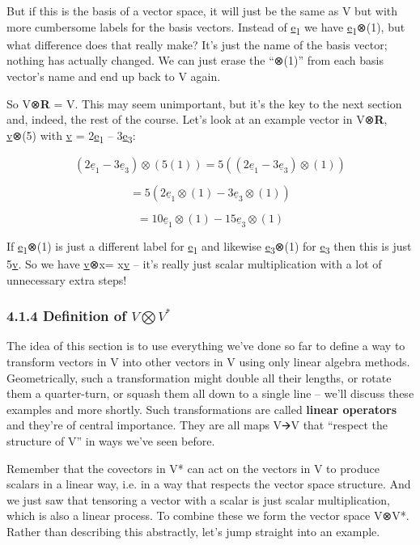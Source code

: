 \documentclass[oneside,english]{amsbook}
\numberwithin{section}{chapter}
\theoremstyle{plain}
\theoremstyle{definition}
\begin{document}
But if this is the basis of a vector space, it will just be the same as
V but with more cumbersome labels for the basis vectors. Instead of
\ul{e}\textsubscript{1} we have \ul{e}\textsubscript{1}⊗(1), but what
difference does that really make? It's just the name of the basis
vector; nothing has actually changed. We can just erase the ``⊗(1)''
from each basis vector's name and end up back to V again.

So V⊗\textbf{R} = V. This may seem unimportant, but it's the key to the
next section and, indeed, the rest of the course. Let's look at an
example vector in V⊗\textbf{R}, \ul{v}⊗(5) with \ul{v} =
2\ul{e}\textsubscript{1} -- 3\ul{e}\textsubscript{3}:

\[\left( 2{\underline{e}}_{1} - 3{\underline{e}}_{3} \right) \otimes \left( 5(1) \right) = 5\left( \left( 2{\underline{e}}_{1} - 3{\underline{e}}_{3} \right) \otimes (1) \right)\]

\[= 5\left( 2{\underline{e}}_{1} \otimes (1) - 3{\underline{e}}_{3} \otimes (1) \right)\]

\[= 10{\underline{e}}_{1} \otimes (1) - 15{\underline{e}}_{3} \otimes (1)\]

If \ul{e}\textsubscript{1}⊗(1) is just a different label for
\ul{e}\textsubscript{1} and likewise \ul{e}\textsubscript{3}⊗(1) for
\ul{e}\textsubscript{3} then this is just 5\ul{v}. So we have \ul{v}⊗x=
x\ul{v} -- it's really just scalar multiplication with a lot of
unnecessary extra steps!

\subsubsection{\texorpdfstring{4.1.4 Definition of
		\(V\bigotimes V^{*}\)}{4.1.4 Definition of V\textbackslash bigotimes V\^{}\{*\}}}\label{definition-of-vbigotimes-v-1}

The idea of this section is to use everything we've done so far to
define a way to transform vectors in V into other vectors in V using
only linear algebra methods. Geometrically, such a transformation might
double all their lengths, or rotate them a quarter-turn, or squash them
all down to a single line -- we'll discuss these examples and more
shortly. Such transformations are called \textbf{linear operators} and
they're of central importance. They are all maps V🡪V that ``respect the
structure of V'' in ways we've seen before.

Remember that the covectors in V* can act on the vectors in V to produce
scalars in a linear way, i.e. in a way that respects the vector space
structure. And we just saw that tensoring a vector with a scalar is just
scalar multiplication, which is also a linear process. To combine these
we form the vector space V⊗V*. Rather than describing this abstractly,
let's jump straight into an example.
\end{document}
